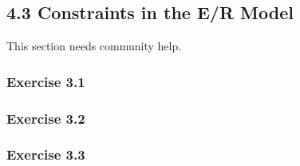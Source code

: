 \documentclass[../../main.tex]{subfiles}
\begin{document}
\subsection{4.3 Constraints in the E/R Model}

This section needs community help.

\subsubsection*{Exercise 3.1}

\subsubsection*{Exercise 3.2}

\subsubsection*{Exercise 3.3}
\end{document}
